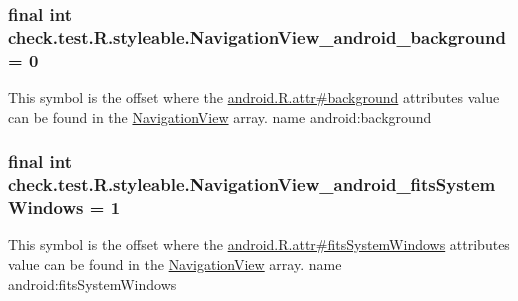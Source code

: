 \subsubsection[{Navigation\+View\+\_\+android\+\_\+background}]{\setlength{\rightskip}{0pt plus 5cm}final int check.\+test.\+R.\+styleable.\+Navigation\+View\+\_\+android\+\_\+background = 0\hspace{0.3cm}{\ttfamily [static]}}\label{classcheck_1_1test_1_1_r_1_1styleable_ad8bc81f909c3c15ed73a95d19448d19a}
This symbol is the offset where the \hyperlink{}{android.\+R.\+attr\#background} attribute\textquotesingle{}s value can be found in the \hyperlink{classcheck_1_1test_1_1_r_1_1styleable_a70ac59d722f1e4aac4b206dcf5f53107}{Navigation\+View} array.  name android\+:background \hypertarget{classcheck_1_1test_1_1_r_1_1styleable_a69ae6facbf34d06b9f470f7471dfff79}{}
\subsubsection[{Navigation\+View\+\_\+android\+\_\+fits\+System\+Windows}]{\setlength{\rightskip}{0pt plus 5cm}final int check.\+test.\+R.\+styleable.\+Navigation\+View\+\_\+android\+\_\+fits\+System\+Windows = 1\hspace{0.3cm}{\ttfamily [static]}}\label{classcheck_1_1test_1_1_r_1_1styleable_a69ae6facbf34d06b9f470f7471dfff79}
This symbol is the offset where the \hyperlink{}{android.\+R.\+attr\#fits\+System\+Windows} attribute\textquotesingle{}s value can be found in the \hyperlink{classcheck_1_1test_1_1_r_1_1styleable_a70ac59d722f1e4aac4b206dcf5f53107}{Navigation\+View} array.  name android\+:fits\+System\+Windows \hypertarget{classcheck_1_1test_1_1_r_1_1styleable_a14840a3ae29e9331de83b023e02fa994}{}
